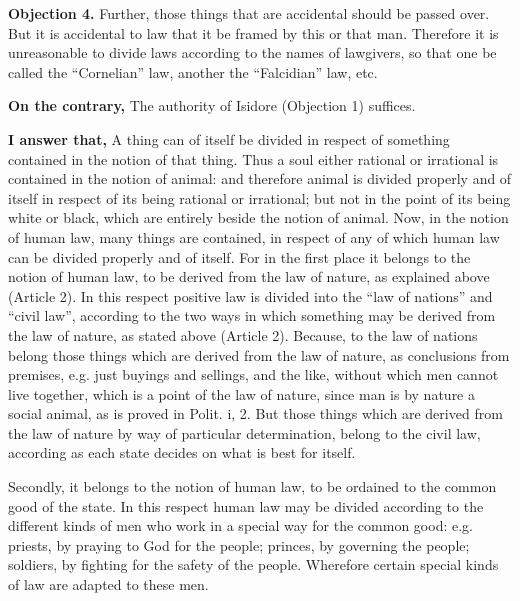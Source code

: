 \textbf{Objection 4.} Further, those things that are accidental should be passed over. But it is accidental to law that it be framed by this or that man. Therefore it is unreasonable to divide laws according to the names of lawgivers, so that one be called the ``Cornelian'' law, another the ``Falcidian'' law, etc.

\textbf{On the contrary,} The authority of Isidore (Objection 1) suffices.

\textbf{I answer that,} A thing can of itself be divided in respect of something contained in the notion of that thing. Thus a soul either rational or irrational is contained in the notion of animal: and therefore animal is divided properly and of itself in respect of its being rational or irrational; but not in the point of its being white or black, which are entirely beside the notion of animal. Now, in the notion of human law, many things are contained, in respect of any of which human law can be divided properly and of itself. For in the first place it belongs to the notion of human law, to be derived from the law of nature, as explained above (Article 2). In this respect positive law is divided into the ``law of nations'' and ``civil law'', according to the two ways in which something may be derived from the law of nature, as stated above (Article 2). Because, to the law of nations belong those things which are derived from the law of nature, as conclusions from premises, e.g. just buyings and sellings, and the like, without which men cannot live together, which is a point of the law of nature, since man is by nature a social animal, as is proved in Polit. i, 2. But those things which are derived from the law of nature by way of particular determination, belong to the civil law, according as each state decides on what is best for itself.

Secondly, it belongs to the notion of human law, to be ordained to the common good of the state. In this respect human law may be divided according to the different kinds of men who work in a special way for the common good: e.g. priests, by praying to God for the people; princes, by governing the people; soldiers, by fighting for the safety of the people. Wherefore certain special kinds of law are adapted to these men.

